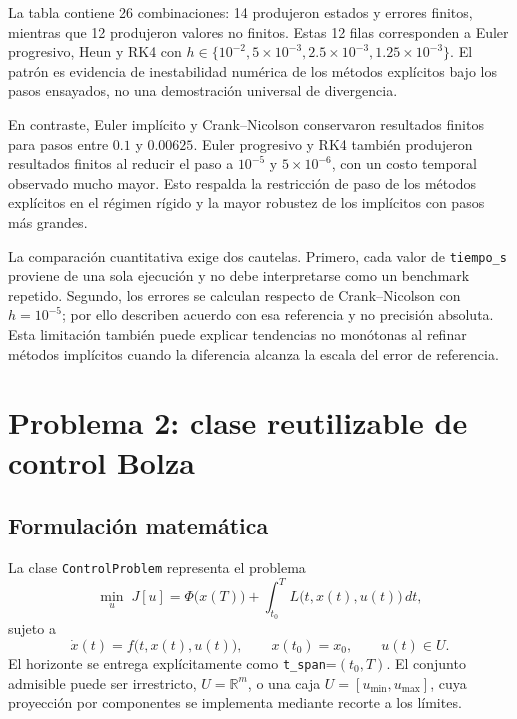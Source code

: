 \documentclass[11pt,a4paper]{article}
\begin{document}
La tabla contiene 26 combinaciones: 14 produjeron estados y errores finitos, mientras que 12 produjeron valores no finitos. Estas 12 filas corresponden a Euler progresivo, Heun y RK4 con $h\in\{10^{-2},5\times10^{-3},2.5\times10^{-3},1.25\times10^{-3}\}$. El patrón es evidencia de inestabilidad numérica de los métodos explícitos bajo los pasos ensayados, no una demostración universal de divergencia.

En contraste, Euler implícito y Crank--Nicolson conservaron resultados finitos para pasos entre $0.1$ y $0.00625$. Euler progresivo y RK4 también produjeron resultados finitos al reducir el paso a $10^{-5}$ y $5\times10^{-6}$, con un costo temporal observado mucho mayor. Esto respalda la restricción de paso de los métodos explícitos en el régimen rígido y la mayor robustez de los implícitos con pasos más grandes.

La comparación cuantitativa exige dos cautelas. Primero, cada valor de \texttt{tiempo\_s} proviene de una sola ejecución y no debe interpretarse como un benchmark repetido. Segundo, los errores se calculan respecto de Crank--Nicolson con $h=10^{-5}$; por ello describen acuerdo con esa referencia y no precisión absoluta. Esta limitación también puede explicar tendencias no monótonas al refinar métodos implícitos cuando la diferencia alcanza la escala del error de referencia.

\section{Problema 2: clase reutilizable de control Bolza}

\subsection{Formulación matemática}

La clase \texttt{ControlProblem} representa el problema
\begin{equation}
    \min_{u}\;J[u]
    =\Phi\bigl(x(T)\bigr)
    +\int_{t_0}^{T}L\bigl(t,x(t),u(t)\bigr)\,dt,
\end{equation}
sujeto a
\begin{equation}
    \dot{x}(t)=f\bigl(t,x(t),u(t)\bigr),
    \qquad x(t_0)=x_0,
    \qquad u(t)\in U.
\end{equation}
El horizonte se entrega explícitamente como \texttt{t\_span}=$(t_0,T)$. El conjunto admisible puede ser irrestricto, $U=\mathbb{R}^m$, o una caja $U=[u_{\min},u_{\max}]$, cuya proyección por componentes se implementa mediante recorte a los límites.
\end{document}
